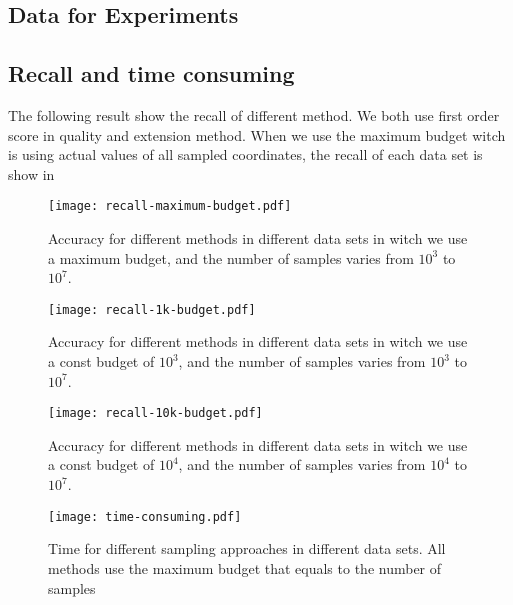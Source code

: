 \documentclass[letterpaper]{article}
\begin{document}
\subsection{Data for Experiments}

\subsection{Recall and time consuming}
The following result show the recall of different method. We both use first order score in quality and extension method.
When we use the maximum budget witch is using actual values of all sampled coordinates, the recall of each data set is show in ~

\begin{figure}[ht]
  \centering
  \texttt{[image: recall-maximum-budget.pdf]}\\
  \caption{Accuracy for different methods in different data sets in witch we use a maximum budget, and the number of samples varies from $10^3$ to $10^7$.}
  \label{Fig:RecallMaxBudget}
\end{figure}

\begin{figure}[ht]
  \centering
  \texttt{[image: recall-1k-budget.pdf]}\\
  \caption{Accuracy for different methods in different data sets in witch we use a const budget of $10^3$, and the number of samples varies from $10^3$ to $10^7$.}
  \label{Fig:Recall1kBudget}
\end{figure}

\begin{figure}[ht]
  \centering
  \texttt{[image: recall-10k-budget.pdf]}\\
  \caption{Accuracy for different methods in different data sets in witch we use a const budget of $10^4$, and the number of samples varies from $10^4$ to $10^7$.}
  \label{Fig:Recall10kBudget}
\end{figure}

\begin{figure}[ht]
  \centering
  \texttt{[image: time-consuming.pdf]}\\
  \caption{Time for different sampling approaches in different data sets. All methods use the maximum budget that equals to the number of samples}
  \label{Fig:Recall10kBudget}
\end{figure}
\end{document}
